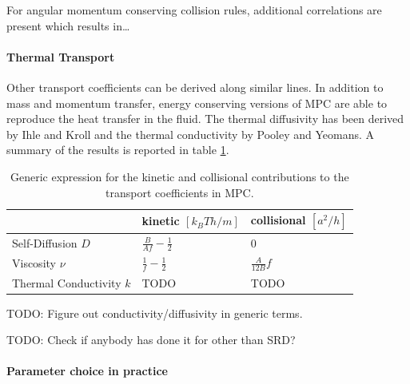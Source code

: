 \documentclass[8.5pt,twoside,twocolumn]{article}
\begin{document}
For angular momentum conserving collision rules, additional correlations are present which results in\dots


\paragraph{Thermal Transport}

Other transport coefficients can be derived along similar lines. In addition to mass and momentum transfer, energy conserving versions of MPC are able to reproduce the heat transfer in the fluid. The thermal diffusivity has been derived by Ihle and Kroll\cite{Ihle} and the thermal conductivity by Pooley and Yeomans\cite{Pooley:2005}. A summary of the results is reported in table \ref{tab:mpc-transport-coefficients}.

\begin{table}\centering
\begin{tabular}{l|l|l}
\hline
  & kinetic $[k_BTh/m]$ & collisional $[a^2/h]$ \\
\hline
Self-Diffusion $D$        & $\frac{B}{A f}-\frac{1}{2}$ & 0 \\
Viscosity $\nu$           & $\frac{1}{f}-\frac{1}{2}$   & $\frac{A}{12B} f$ \\
Thermal Conductivity $k$  & TODO & TODO \\
\hline
\end{tabular}
\caption{Generic expression for the kinetic and collisional contributions to the transport coefficients in MPC.}
\label{tab:mpc-transport-coefficients}
\end{table}

TODO: Figure out conductivity/diffusivity in generic terms.

TODO: Check if anybody has done it for other than SRD?

\paragraph{Parameter choice in practice}
\end{document}
